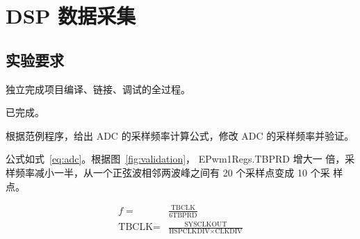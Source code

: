 \documentclass[../main]{subfiles}
\begin{document}
\chapter{DSP 数据采集}%
\label{cha:ad}

\section{实验要求}%
\label{sec:\arabic{chapter}requirement}

\begin{Exercise}
  独立完成项目编译、链接、调试的全过程。
\end{Exercise}

\begin{Answer}
  已完成。
\end{Answer}

\begin{Exercise}
  根据范例程序，给出 ADC 的采样频率计算公式，修改 ADC 的采样频率并验证。
\end{Exercise}

\begin{Answer}
  公式如式~\ref{eq:adc}。根据图~\ref{fig:validation}， EPwm1Regs.TBPRD 增大一
  倍，采样频率减小一半，从一个正弦波相邻两波峰之间有 20 个采样点变成 10 个采
  样点。
\end{Answer}

\begin{align}
  \label{eq:adc}
  f = & \frac{\text{TBCLK}}{6\text{TBPRD}}\\
  \label{eq:tbclk}
  \text{TBCLK} = & \frac{\text{SYSCLKOUT}}{\text{HSPCLKDIV} \times \text{CLKDIV}}
\end{align}
\end{document}
